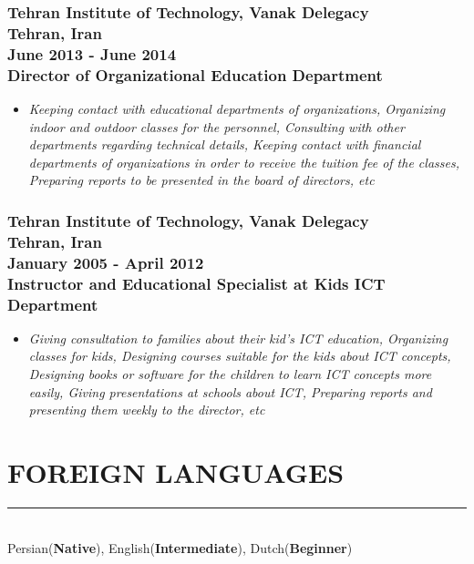 \documentclass[10pt,a4paper]{article}
\begin{document}
\subsubsection{{\large Tehran Institute of Technology, Vanak Delegacy} \\ \textnormal{Tehran, Iran} \\ \textnormal{June 2013 - June 2014} \\ {Director of Organizational Education Department}}
  \setlength{\leftskip}{0.5cm}
  \setlength{\rightskip}{1cm}
  \begin{itemize}
    \setlength{\rightskip}{1cm}
    \setlength\itemsep{0em}
    \item \small \textit {Keeping contact with educational departments of organizations, Organizing indoor and outdoor classes for the personnel, Consulting with other departments regarding technical details, Keeping contact with financial departments of organizations in order to receive the tuition fee of the classes, Preparing reports to be presented in the board of directors, etc}
  \end{itemize}
  \setlength{\leftskip}{0pt}
  \setlength{\rightskip}{0cm}
  
\subsubsection{{\large Tehran Institute of Technology, Vanak Delegacy} \\ \textnormal{Tehran, Iran} \\ \textnormal{January 2005 - April 2012} \\ {Instructor and Educational Specialist at Kids ICT Department}}
  \setlength{\leftskip}{0.5cm}
  \setlength{\rightskip}{1cm}
  \begin{itemize}
    \setlength{\rightskip}{1cm}
    \setlength\itemsep{0em}
    \item \small \textit {Giving consultation to families about their kid's ICT education, Organizing classes for kids, Designing courses suitable for the kids about ICT concepts, Designing books or software for the children to learn ICT concepts more easily, Giving presentations at schools about ICT, Preparing reports and presenting them weekly to the director, etc}
  \end{itemize}
  \setlength{\leftskip}{0pt}
  \setlength{\rightskip}{0cm}
 
\section{FOREIGN LANGUAGES}
\noindent \rule {5.6cm}{0.4pt} \\
    Persian(\textbf{Native}), English(\textbf{Intermediate}), Dutch(\textbf{Beginner}) \\
  
\end{document}
